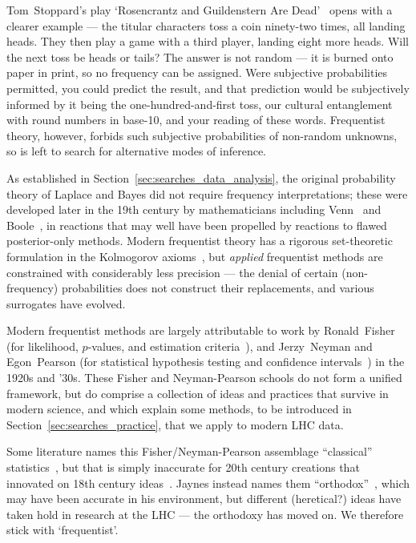 Tom~Stoppard's play `Rosencrantz and Guildenstern Are Dead'~\cite{
stoppard1967rosencrantz
}
opens with a clearer example ---
the titular characters toss a coin ninety-two times, all landing heads.
They then play a game with a third player, landing eight more heads.
Will the next toss be heads or tails?
The answer is not random --- it is burned onto paper in print, so no frequency
can be assigned.
Were subjective probabilities permitted, you could predict the result, and that
prediction would be subjectively informed by it being the one-hundred-and-first
toss, our cultural entanglement with round numbers in base-10, and your reading
of these words.
Frequentist theory, however, forbids such subjective probabilities of
non-random unknowns, so is left to search for alternative modes of inference.

As established in Section~\ref{sec:searches_data_analysis}, the original
probability theory of Laplace and Bayes did not require frequency
interpretations; these were developed later in the 19th century by
mathematicians including Venn~\cite{venn1866logic} and
Boole~\cite{boole1854investigation}, in reactions that may well have been
propelled by reactions to flawed posterior-only methods.
Modern frequentist theory has a rigorous set-theoretic formulation in the
Kolmogorov axioms~\cite{
kolomogoroff1933de,
kolomogoroff1950translated,
Neyman1937Outline,
axioms1010038
}, but \emph{applied} frequentist methods are constrained with considerably less
precision --- the denial of certain (non-frequency) probabilities does not
construct their replacements, and various surrogates have evolved.

Modern frequentist methods are largely attributable to work by
Ronald~Fisher (for likelihood, $p$-values, and estimation criteria~\cite{
fisher1912fitting,
fisher1915frequency,
fisher1921probable,
fisher1922estimators,
fisher1925smrw,
fisher1956statistical
}),
and Jerzy~Neyman and Egon~Pearson
(for statistical hypothesis testing and confidence intervals~\cite{
neymanpearson1933lemma,
neymanpearson1928max
})
in the 1920s and '30s.
These Fisher and Neyman-Pearson schools do not form a unified framework, but
do comprise a collection of ideas and practices that survive in modern science,
and which explain some methods, to be introduced in
Section~\ref{sec:searches_practice}, that we apply to modern LHC data.

Some literature names this Fisher/Neyman-Pearson assemblage
``classical'' statistics~\cite{
Neyman1937Outline,
lehmann2011fisher,
Feldman:1997qc
}, but that is simply inaccurate for 20th century creations that innovated on
18th century ideas~\cite{bayes1763lii, laplace1774stigler}.
Jaynes instead names them ``orthodox''~\cite{
Jaynes1976intervals,
jaynes2003probability
},
which may have been accurate in his environment, but different
(heretical?) ideas have taken hold in research at the LHC ---
the orthodoxy has moved on.
We therefore stick with `frequentist'.


